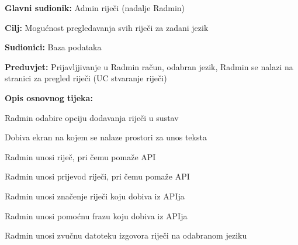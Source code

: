 \noindent {}
\begin{packed_item}

	\item \textbf{Glavni sudionik: } Admin riječi (nadalje Radmin)
	\item \textbf{Cilj: } Mogućnost pregledavanja svih riječi za zadani jezik
	\item \textbf{Sudionici: } Baza podataka
	\item \textbf{Preduvjet: } Prijavljjivanje u Radmin račun, odabran jezik, Radmin se nalazi na stranici za pregled riječi (UC stvaranje riječi)	
	\item  \textbf{Opis osnovnog tijeka:}
	
	\item[] \begin{packed_enum}
		
		\item Radmin odabire opciju dodavanja riječi u sustav
		\item Dobiva ekran na kojem se nalaze prostori za unos teksta
		\item Radmin unosi riječ, pri čemu pomaže API
		\item Radmin unosi prijevod riječi, pri čemu pomaže API
		\item Radmin unosi značenje riječi koju dobiva iz APIja
		\item Radmin unosi pomoćnu frazu koju dobiva iz APIja
		\item Radmin unosi zvučnu datoteku izgovora riječi na odabranom jeziku

	\end{packed_enum}
	
\end{packed_item}


